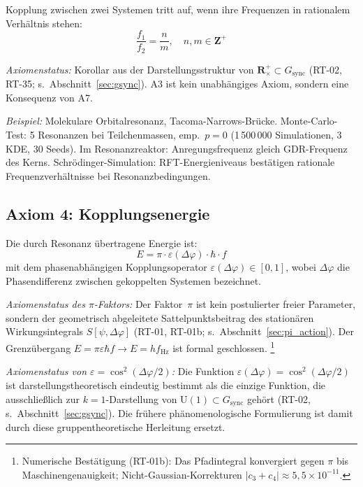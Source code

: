 \documentclass[12pt]{iopart}
\providecommand{\mathbb}[1]{\mathbf{#1}}
\begin{document}
	Kopplung zwischen zwei Systemen tritt auf, wenn ihre
	Frequenzen in rationalem Verh\"altnis stehen:
	\begin{equation}
		\frac{f_1}{f_2} = \frac{n}{m}, \quad
		n, m \in \mathbb{Z}^+
		\label{eq:resonance_condition}
	\end{equation}
	
	\textit{Axiomenstatus:} Korollar aus der Darstellungsstruktur
	von $\mathbb{R}^+_\times \subset G_{\mathrm{sync}}$
	(RT-02, RT-35; s.~Abschnitt~\ref{sec:gsync}).
	A3 ist kein unabh\"angiges Axiom, sondern eine Konsequenz
	von A7.
	
	\textit{Beispiel:} Molekulare Orbitalresonanz,
	Tacoma-Narrows-Br\"ucke.
	Monte-Carlo-Test: 5 Resonanzen bei Teilchenmassen,
	emp.\ $p = 0$ (1\,500\,000 Simulationen, 3 KDE, 30 Seeds).
	Im Resonanzreaktor: Anregungsfrequenz gleich
	GDR-Frequenz des Kerns.
	Schr\"odinger-Simulation: RFT-Energieniveaus best\"atigen rationale
	Frequenzverh\"altnisse bei Resonanzbedingungen.
	
	\subsection{Axiom 4: Kopplungsenergie}
	
	Die durch Resonanz \"ubertragene Energie ist:
	\begin{equation}
		E = \pi \cdot \varepsilon(\Delta\varphi) \cdot \hbar \cdot f
		\label{eq:grundformel}
	\end{equation}
	mit dem phasenabh\"angigen Kopplungsoperator
	$\varepsilon(\Delta\varphi) \in [0,1]$, wobei
	$\Delta\varphi$ die Phasendifferenz zwischen gekoppelten
	Systemen bezeichnet.
	
	\textit{Axiomenstatus des $\pi$-Faktors:} Der Faktor~$\pi$
	ist kein postulierter freier Parameter, sondern der
	geometrisch abgeleitete Sattelpunktsbeitrag des stationären
	Wirkungsintegrals $S[\psi, \Delta\varphi]$ (RT-01, RT-01b;
	s.~Abschnitt~\ref{sec:pi_action}).
	Der Grenz\"ubergang $E = \pi\varepsilon\hbar f \to E = hf_{\mathrm{Hz}}$
	ist formal geschlossen.%
	\footnote{Numerische Best\"atigung (RT-01b): Das Pfadintegral
	konvergiert gegen $\pi$ bis Maschinengenauigkeit;
	Nicht-Gaussian-Korrekturen
	$|c_3 + c_4| \approx 5{,}5\times10^{-11}$.}
	
	\textit{Axiomenstatus von $\varepsilon = \cos^2(\Delta\varphi/2)$:}
	Die Funktion $\varepsilon(\Delta\varphi) = \cos^2(\Delta\varphi/2)$
	ist darstellungstheoretisch eindeutig bestimmt als die einzige
	Funktion, die ausschlie\ss{}lich zur $k{=}1$-Darstellung von
	$\mathrm{U}(1) \subset G_{\mathrm{sync}}$ geh\"ort
	(RT-02, s.~Abschnitt~\ref{sec:gsync}).
	Die fr\"uhere ph\"anomenologische Formulierung ist damit durch
	diese gruppentheoretische Herleitung ersetzt.
	
\end{document}

